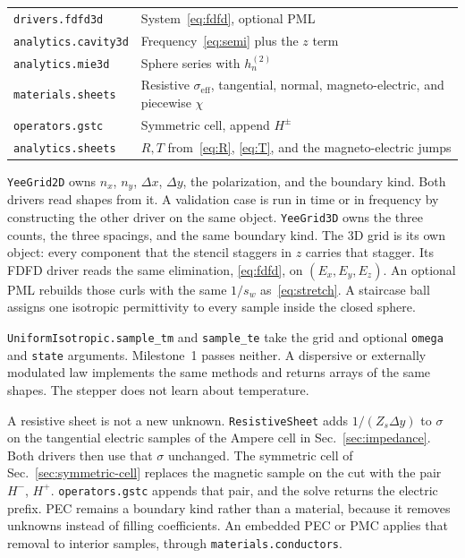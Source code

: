 \documentclass[11pt,a4paper]{article}
\numberwithin{equation}{section}
\begin{document}
\begin{center}
\begin{tabular}{@{}ll@{}}
\texttt{drivers.fdfd3d} & System~\eqref{eq:fdfd}, optional PML\\
\texttt{analytics.cavity3d} & Frequency~\eqref{eq:semi} plus the $z$ term\\
\texttt{analytics.mie3d} & Sphere series with $h_n^{(2)}$\\
\texttt{materials.sheets} & Resistive $\sigma_{\mathrm{eff}}$, tangential, normal, magneto-electric, and piecewise $\chi$\\
\texttt{operators.gstc} & Symmetric cell, append $H^\pm$\\
\texttt{analytics.sheets} & $R,T$ from~\eqref{eq:R}, \eqref{eq:T}, and the magneto-electric jumps\\
\bottomrule
\end{tabular}
\end{center}

\texttt{YeeGrid2D} owns $n_x$, $n_y$, $\Delta x$, $\Delta y$, the polarization,
and the boundary kind. Both drivers read shapes from it. A validation case is
run in time or in frequency by constructing the other driver on the same
object. \texttt{YeeGrid3D} owns the three counts, the three spacings, and the
same boundary kind. The 3D grid is its own object: every component that the
stencil staggers in $z$ carries that stagger. Its FDFD driver reads the same
elimination, \eqref{eq:fdfd}, on $(E_x,E_y,E_z)$. An optional PML rebuilds
those curls with the same $1/s_w$ as~\eqref{eq:stretch}. A staircase ball
assigns one isotropic permittivity to every sample inside the closed sphere.

\texttt{UniformIsotropic.sample\_tm} and \texttt{sample\_te} take the grid and
optional \texttt{omega} and \texttt{state} arguments. Milestone~1 passes
neither. A dispersive or externally modulated law implements the same methods
and returns arrays of the same shapes. The stepper does not learn about
temperature.

A resistive sheet is not a new unknown. \texttt{ResistiveSheet} adds
$1/(Z_s\Delta y)$ to $\sigma$ on the tangential electric samples of the
Ampere cell in Sec.~\ref{sec:impedance}. Both drivers then use that
$\sigma$ unchanged. The symmetric cell of Sec.~\ref{sec:symmetric-cell}
replaces the magnetic sample on the cut with the pair $H^-$, $H^+$.
\texttt{operators.gstc} appends that pair, and the solve returns the
electric prefix. PEC remains a boundary kind rather
than a material, because it removes unknowns instead of filling
coefficients. An embedded PEC or PMC applies that removal to interior
samples, through \texttt{materials.conductors}.
\end{document}
